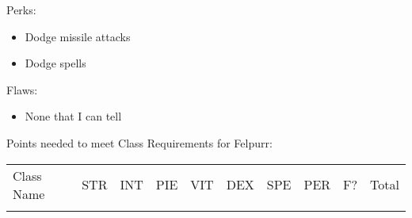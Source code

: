 \documentclass[12pt]{article}
\providecommand{\tightlist}{%
  \setlength{\itemsep}{0pt}\setlength{\parskip}{0pt}}
\newcommand{\WviiTwoColumnSetup}{\raggedcolumns\RaggedRight}
\begin{document}
\begin{multicols}{2}\WviiTwoColumnSetup
Perks:

\begin{itemize}
\item
  Dodge missile attacks
\item
  Dodge spells
\end{itemize}
\columnbreak

Flaws:

\begin{itemize}
\tightlist
\item
  None that I can tell
\end{itemize}
\end{multicols}

Points needed to meet Class Requirements for Felpurr:

\begin{longtable}[]{@{}llllllllll@{}}
\toprule
\begin{minipage}[t]{0.13\columnwidth}\raggedright\strut
Class Name
\strut\end{minipage} &
\begin{minipage}[t]{0.06\columnwidth}\raggedright\strut
STR
\strut\end{minipage} &
\begin{minipage}[t]{0.06\columnwidth}\raggedright\strut
INT
\strut\end{minipage} &
\begin{minipage}[t]{0.06\columnwidth}\raggedright\strut
PIE
\strut\end{minipage} &
\begin{minipage}[t]{0.06\columnwidth}\raggedright\strut
VIT
\strut\end{minipage} &
\begin{minipage}[t]{0.06\columnwidth}\raggedright\strut
DEX
\strut\end{minipage} &
\begin{minipage}[t]{0.06\columnwidth}\raggedright\strut
SPE
\strut\end{minipage} &
\begin{minipage}[t]{0.06\columnwidth}\raggedright\strut
PER
\strut\end{minipage} &
\begin{minipage}[t]{0.07\columnwidth}\raggedright\strut
F?
\strut\end{minipage} &
\begin{minipage}[t]{0.08\columnwidth}\raggedright\strut
Total
\strut\end{minipage}\tabularnewline
\begin{minipage}[t]{0.13\columnwidth}\raggedright\strut

\end{minipage}
\end{longtable}
\end{document}
